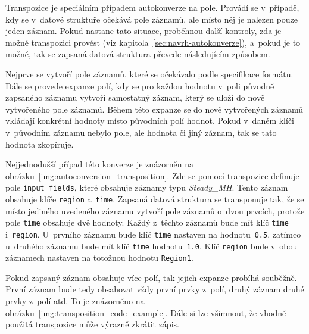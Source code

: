 \documentclass[FM,bw,DP]{tulthesis}
\begin{document}
Transpozice je speciálním případem autokonverze na pole. Provádí se v~případě, kdy se v~datové struktuře očekává pole záznamů, ale místo něj je nalezen pouze jeden záznam. Pokud nastane tato situace, proběhnou další kontroly, zda je možné transpozici provést (viz kapitola~\ref{sec:navrh-autokonverze}), a~pokud je to možné, tak se zapsaná datová struktura převede následujícím způsobem.

Nejprve se vytvoří pole záznamů, které se očekávalo podle specifikace formátu. Dále se provede expanze polí, kdy se pro každou hodnotu v~poli původně zapsaného záznamu vytvoří samostatný záznam, který se uloží do nově vytvořeného pole záznamů. Během této expanze se do nově vytvořených záznamů vkládají kon\-krétní hodnoty místo původních polí hodnot. Pokud v~daném klíči v~původním záznamu nebylo pole, ale hodnota či jiný záznam, tak se tato hodnota zkopíruje.

Nejjednodušší případ této konverze je znázorněn na obrázku~\ref{img:autoconversion_transposition}. Zde se pomocí transpozice definuje pole \texttt{input\_fields}, které obsahuje záznamy typu \textit{Steady\_MH}. Tento záznam obsahuje klíče \texttt{region} a~\texttt{time}. Zapsaná datová struktura se transponuje tak, že se místo jediného uvedeného záznamu vytvoří pole záznamů o~dvou prvcích, protože pole \texttt{time} obsahuje dvě hodnoty. Každý z~těchto záznamů bude mít klíč \texttt{time} i~\texttt{region}. U~prvního záznamu bude klíč \texttt{time} nastaven na hodnotu~\texttt{0.5}, zatímco u~druhého záznamu bude mít klíč \texttt{time} hodnotu~\texttt{1.0}. Klíč \texttt{region} bude v~obou záznamech nastaven na totožnou hodnotu \texttt{Region1}.

Pokud zapsaný záznam obsahuje více polí, tak jejich expanze probíhá souběžně. První záznam bude tedy obsahovat vždy první prvky z~polí, druhý záznam druhé prvky z~polí atd. To je znázorněno na obrázku~\ref{img:transposition_code_example}. Dále si lze všimnout, že vhodně použitá transpozice může výrazně zkrátit zápis.

\lstset{style=code}
\end{document}
